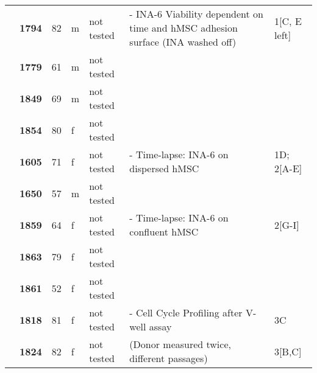 {\begin{longtable}{%
    |>{\bfseries}p{1.5cm}|
    >{\bfseries}p{1.2cm}|
    p{1.2cm}|
    p{1cm}|
    p{2.3cm}|
    >{\tiny}p{4cm}|
    p{1.7cm}|
    }
    \hhline{~------}
     & 1794  & 82 & m & not tested & - INA-6 Viability dependent on time and hMSC adhesion surface (INA washed off)                           & 1[C, E left]                            \\
    \hhline{~----~~}
     & 1779  & 61 & m & not tested &                                                                                                          &                                         \\
    \hhline{~----~~}
     & 1849  & 69 & m & not tested &                                                                                                          &                                         \\
    \hhline{~----~~}
     & 1854  & 80 & f & not tested &                                                                                                          &                                         \\
    \hhline{~------}
     & 1605  & 71 & f & not tested & - Time-lapse: INA-6 on dispersed hMSC                                                                    & 1D; 2[A-E]                              \\
    \hhline{~----~~}
     & 1650  & 57 & m & not tested &                                                                                                          &                                         \\
    \hhline{~------}
     & 1859  & 64 & f & not tested & - Time-lapse: INA-6 on confluent hMSC                                                                    & 2[G-I]                                  \\
    \hhline{~----~~}
     & 1863  & 79 & f & not tested &                                                                                                          &                                         \\
    \hhline{~----~~}
     & 1861  & 52 & f & not tested &                                                                                                          &                                         \\
    \hhline{~------}
     & 1818  & 81 & f & not tested & - Cell Cycle Profiling after V-well assay                                                                & 3C                                      \\
    \hhline{~------}
     & 1824  & 82 & f & not tested & (Donor measured twice, different passages)                                                               & 3[B,C]                                  \\

\end{longtable}}
